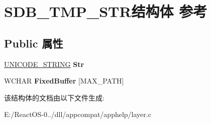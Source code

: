 \hypertarget{struct_s_d_b___t_m_p___s_t_r}{}\section{S\+D\+B\+\_\+\+T\+M\+P\+\_\+\+S\+T\+R结构体 参考}
\label{struct_s_d_b___t_m_p___s_t_r}
\subsection*{Public 属性}
\begin{DoxyCompactItemize}
\item 
\mbox{\label{struct_s_d_b___t_m_p___s_t_r_ac00939f8f20a1aa63076c9b554b4dc72}} 
\hyperlink{struct___u_n_i_c_o_d_e___s_t_r_i_n_g}{U\+N\+I\+C\+O\+D\+E\+\_\+\+S\+T\+R\+I\+NG} {\bfseries Str}
\item 
\mbox{\label{struct_s_d_b___t_m_p___s_t_r_aa7ca4e817087dbb9ddf9095b3bb91d31}} 
W\+C\+H\+AR {\bfseries Fixed\+Buffer} \mbox{[}M\+A\+X\+\_\+\+P\+A\+TH\mbox{]}
\end{DoxyCompactItemize}


该结构体的文档由以下文件生成\+:\begin{DoxyCompactItemize}
\item 
E\+:/\+React\+O\+S-\/0../dll/appcompat/apphelp/layer.\+c\end{DoxyCompactItemize}
